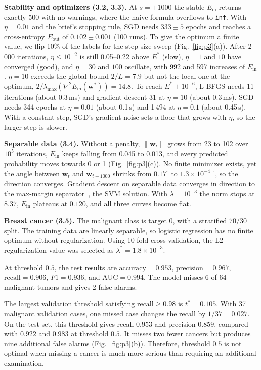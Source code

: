 \documentclass[conference]{IEEEtran}
\newcommand{\Ein}{E_{\mathrm{in}}}
\newcommand{\Eout}{E_{\mathrm{out}}}
\newcommand{\w}{\mathbf{w}}
\begin{document}
\textbf{Stability and optimizers (3.2, 3.3).} At $s=\pm1000$ the stable $\Ein$ returns exactly 500 with no warnings, where the naive formula overflows to \texttt{inf}. With $\eta=0.01$ and the brief's stopping rule, SGD needs $333\pm5$ epochs and reaches a cross-entropy $\Eout$ of $0.102\pm0.001$ (100 runs). To give the optimum a finite value, we flip 10\% of the labels for the step-size sweep (Fig.~\ref{fig:p3}(a)). After 2\,000 iterations, $\eta\le10^{-2}$ is still 0.05--0.22 above $E^*$ (slow), $\eta=1$ and $10$ have converged (good), and $\eta=30$ and $100$ oscillate, with 992 and 597 increases of $\Ein$. $\eta=10$ exceeds the global bound $2/L=7.9$ but not the local one at the optimum, $2/\lambda_{\max}(\nabla^2\Ein(\w^*))=14.8$. To reach $E^*+10^{-6}$, L-BFGS needs 11 iterations (about 0.3\,ms) and gradient descent 31 at $\eta=10$ (about 0.3\,ms). SGD needs 344 epochs at $\eta=0.01$ (about 0.1\,s) and 1\,494 at $\eta=0.1$ (about 0.45\,s). With a constant step, SGD's gradient noise sets a floor that grows with $\eta$, so the larger step is slower.

\textbf{Separable data (3.4).} Without a penalty, $\lVert\w_t\rVert$ grows from 23 to 102 over $10^5$ iterations, $\Ein$ keeps falling from 0.045 to 0.013, and every predicted probability moves towards 0 or 1 (Fig.~\ref{fig:p3}(c)). No finite minimizer exists, yet the angle between $\w_t$ and $\w_{t+1000}$ shrinks from $0.17^\circ$ to $1.3\times10^{-4\,\circ}$, so the direction converges. Gradient descent on separable data converges in direction to the max-margin separator~\cite{soudry2018}, the SVM solution. With $\lambda=10^{-3}$ the norm stops at $8.37$, $\Ein$ plateaus at $0.120$, and all three curves become flat.

\textbf{Breast cancer (3.5).}
The malignant class is target 0, with a stratified \(70/30\) split. The
training data are linearly separable, so logistic regression has no finite
optimum without regularization. Using 10-fold cross-validation, the L2
regularization value was selected as
\(\lambda^*=1.8\times10^{-3}\).

At threshold \(0.5\), the test results are
\(\mathrm{accuracy}=0.953\), \(\mathrm{precision}=0.967\),
\(\mathrm{recall}=0.906\), \(F1=0.936\), and \(\mathrm{AUC}=0.994\).
The model misses 6 of 64 malignant tumors and gives 2 false alarms.

The largest validation threshold satisfying
\(\mathrm{recall}\geq0.98\) is \(t^*=0.105\). With 37 malignant validation
cases, one missed case changes the recall by \(1/37=0.027\). On the test set,
this threshold gives recall \(0.953\) and precision \(0.859\), compared with
\(0.922\) and \(0.983\) at threshold \(0.5\). It misses two fewer cancers but
produces nine additional false alarms (Fig.~\ref{fig:p3}(b)). Therefore,
threshold \(0.5\) is not optimal when missing a cancer is much more serious
than requiring an additional examination.
\end{document}
